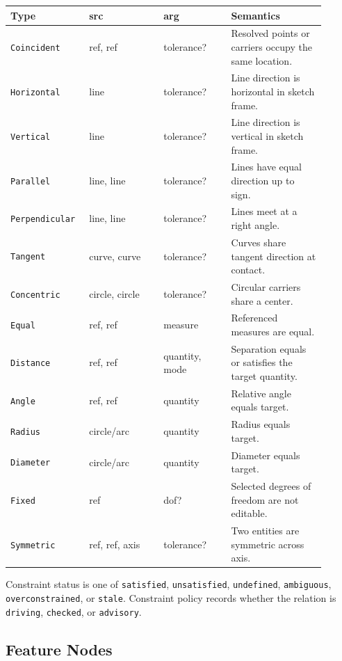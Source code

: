 \documentclass[11pt]{article}
\newcommand{\Type}[1]{\texttt{#1}}
\begin{document}
\begin{center}
\small
\begin{tabular}{@{}p{0.19\linewidth}p{0.22\linewidth}p{0.20\linewidth}p{0.29\linewidth}@{}}
\hline
\textbf{Type} & \textbf{src} & \textbf{arg} & \textbf{Semantics} \\
\hline
\Type{Coincident} & ref, ref & tolerance? & Resolved points or carriers occupy the same location. \\
\Type{Horizontal} & line & tolerance? & Line direction is horizontal in sketch frame. \\
\Type{Vertical} & line & tolerance? & Line direction is vertical in sketch frame. \\
\Type{Parallel} & line, line & tolerance? & Lines have equal direction up to sign. \\
\Type{Perpendicular} & line, line & tolerance? & Lines meet at a right angle. \\
\Type{Tangent} & curve, curve & tolerance? & Curves share tangent direction at contact. \\
\Type{Concentric} & circle, circle & tolerance? & Circular carriers share a center. \\
\Type{Equal} & ref, ref & measure & Referenced measures are equal. \\
\Type{Distance} & ref, ref & quantity, mode & Separation equals or satisfies the target quantity. \\
\Type{Angle} & ref, ref & quantity & Relative angle equals target. \\
\Type{Radius} & circle/arc & quantity & Radius equals target. \\
\Type{Diameter} & circle/arc & quantity & Diameter equals target. \\
\Type{Fixed} & ref & dof? & Selected degrees of freedom are not editable. \\
\Type{Symmetric} & ref, ref, axis & tolerance? & Two entities are symmetric across axis. \\
\hline
\end{tabular}
\end{center}

Constraint status is one of \Type{satisfied}, \Type{unsatisfied}, \Type{undefined}, \Type{ambiguous}, \Type{overconstrained}, or \Type{stale}. Constraint policy records whether the relation is \Type{driving}, \Type{checked}, or \Type{advisory}.

\subsection{Feature Nodes}
\end{document}

